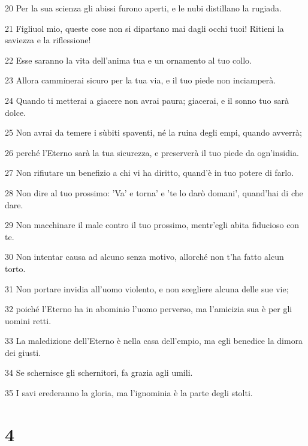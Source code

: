\par 20 Per la sua scienza gli abissi furono aperti, e le nubi distillano la rugiada.
\par 21 Figliuol mio, queste cose non si dipartano mai dagli occhi tuoi! Ritieni la saviezza e la riflessione!
\par 22 Esse saranno la vita dell'anima tua e un ornamento al tuo collo.
\par 23 Allora camminerai sicuro per la tua via, e il tuo piede non inciamperà.
\par 24 Quando ti metterai a giacere non avrai paura; giacerai, e il sonno tuo sarà dolce.
\par 25 Non avrai da temere i sùbiti spaventi, né la ruina degli empi, quando avverrà;
\par 26 perché l'Eterno sarà la tua sicurezza, e preserverà il tuo piede da ogn'insidia.
\par 27 Non rifiutare un benefizio a chi vi ha diritto, quand'è in tuo potere di farlo.
\par 28 Non dire al tuo prossimo: 'Va' e torna' e 'te lo darò domani', quand'hai di che dare.
\par 29 Non macchinare il male contro il tuo prossimo, mentr'egli abita fiducioso con te.
\par 30 Non intentar causa ad alcuno senza motivo, allorché non t'ha fatto alcun torto.
\par 31 Non portare invidia all'uomo violento, e non scegliere alcuna delle sue vie;
\par 32 poiché l'Eterno ha in abominio l'uomo perverso, ma l'amicizia sua è per gli uomini retti.
\par 33 La maledizione dell'Eterno è nella casa dell'empio, ma egli benedice la dimora dei giusti.
\par 34 Se schernisce gli schernitori, fa grazia agli umili.
\par 35 I savi erederanno la gloria, ma l'ignominia è la parte degli stolti.

\chapter{4}

